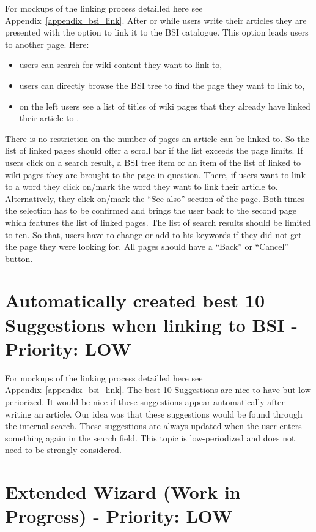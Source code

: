 \begin{tcolorbox}[breakable,colback=red!12,colframe=red!40!black,title=UPDATE 15/11/2017]
    For mockups of the linking process detailled here see Appendix~\ref{appendix_bsi_link}.
    After or while users write their articles they are presented with the option to link it to the BSI catalogue.
    This option leads users to another page. Here:
    \begin{itemize}

        \item users can search for wiki content they want to link to,
        \item users can directly browse the BSI tree to find the page they want to link to,
        \item on the left  users see a list of titles of wiki pages that they already have linked their article to
            .
    \end{itemize}
    There is no restriction on the number of pages an article can be linked to.
    So the list of linked pages should offer a scroll bar if the list exceeds the page limits.
    If users click on a search result, a BSI tree item or an item of the list of linked to wiki pages they are brought to the page in question.
    There, if users want to link to a word they click on/mark the word they want to link their article to.
    Alternatively, they click on/mark the ``See also'' section of the page.
    Both times the selection has to be confirmed and brings the user back to the second page which features the list of linked pages.
    The list of search results should be limited to ten.
    So that, users have to change or add to his keywords if they did not get the page they were looking for.
    All pages should have a ``Back'' or ``Cancel'' button.  
\end{tcolorbox}


\section{Automatically created best 10 Suggestions when linking to BSI - Priority: LOW}
\begin{tcolorbox}[breakable,colback=red!18,colframe=red!40!black,title=UPDATE 01/12/2017]
   For mockups of the linking process detailled here see Appendix~\ref{appendix_bsi_link}.
   The best 10 Suggestions are nice to have but low periorized. It would be nice if these suggestions appear automatically after writing an article. Our idea was that these suggestions would be found through the internal search. These suggestions are always updated when the user enters something again in the search field. This topic is low-periodized and does not need to be strongly considered.   
\end{tcolorbox}



\section{Extended Wizard (Work in Progress) - Priority: LOW}

